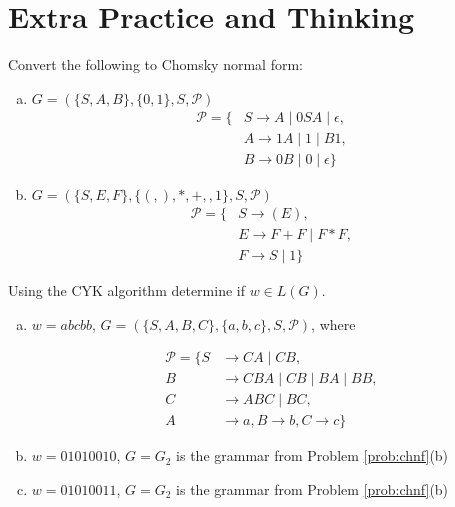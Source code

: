 \documentclass[a4paper,12pt]{amsart}
\begin{document}
\section*{Extra Practice and Thinking}


\medskip\begin{problem}

    Convert the following to Chomsky normal form:
    \begin{multicols}{2}
        \begin{enumerate}[(a)]
    
            \item $G=(\{S,A,B\},\{0,1\},S,\mathcal P)$
            \begin{align*}
                \mathcal P=\{&S\rightarrow A\mid 0SA\mid \epsilon, \\
                &A\rightarrow 1A\mid 1\mid B1,\\
                &B\rightarrow 0B\mid 0\mid \epsilon\} 
            \end{align*}
    
            \item $G=(\{S,E,F\},\{(,),*,+,,1\},S,\mathcal P)$
            \begin{align*}
                \mathcal P=\{&
                S\rightarrow (E), \\
                &E\rightarrow F+F\mid F*F,\\
                &F\rightarrow S\mid 1\}
            \end{align*}

        \end{enumerate}
    \end{multicols}
        
\end{problem}


\medskip\begin{problem}
    
    Using the CYK algorithm determine if $w\in L(G)$.

    \begin{enumerate}[(a)]\setlength{\itemsep}{6pt}

        \item $w=abcbb$, $G=(\{S,A,B,C\},\{a,b,c\},S,\mathcal P)$, where
        
        \begin{align*}
            \mathcal P=\{S&\rightarrow CA\mid CB, \\
            B&\rightarrow CBA\mid CB\mid BA\mid BB, \\
            C&\rightarrow ABC\mid BC,\\
            A&\rightarrow a, B\rightarrow b, C\rightarrow c\}
        \end{align*}    

        \item $w=01010010$, $G=G_2$ is the grammar from Problem \ref{prob:chnf}(b)
        \item $w=01010011$, $G=G_2$ is the grammar from Problem \ref{prob:chnf}(b)

    \end{enumerate}

\end{problem}
\end{document}
